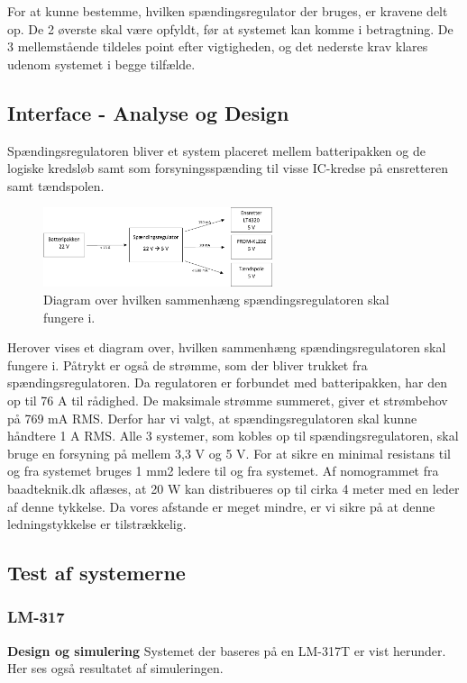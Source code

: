 For at kunne bestemme, hvilken spændingsregulator der bruges, er kravene delt op. De 2 øverste skal være opfyldt, før at systemet kan komme i betragtning. De 3 mellemstående tildeles point efter vigtigheden, og det nederste krav klares udenom systemet i begge tilfælde.

\subsection{Interface - Analyse og Design }
\label{sec:interface-analyse-og}

Spændingsregulatoren bliver et system placeret mellem batteripakken og de logiske kredsløb samt som forsyningsspænding til visse IC-kredse på ensretteren samt tændspolen.

\begin{figure}[h]
  \centering
  \includegraphics[width=0.6\textwidth]{jfig1.pdf}
  \caption{Diagram over hvilken sammenhæng spændingsregulatoren skal fungere i.}
  \label{fig:dia1}
\end{figure}

Herover vises et diagram over, hvilken sammenhæng spændingsregulatoren skal fungere i. Påtrykt er også de strømme, som der bliver trukket fra spændingsregulatoren. Da regulatoren er forbundet med batteripakken, har den op til 76 A til rådighed. De maksimale strømme summeret, giver et strømbehov på 769 mA RMS. Derfor har vi valgt, at spændingsregulatoren skal kunne håndtere 1 A RMS. Alle 3 systemer, som kobles op til spændingsregulatoren, skal bruge en forsyning på mellem 3,3 V og 5 V. 
For at sikre en minimal resistans til og fra systemet bruges 1 mm2 ledere til og fra systemet. Af nomogrammet fra baadteknik.dk aflæses, at 20 W kan distribueres op til cirka 4 meter med en leder af denne tykkelse. Da vores afstande er meget mindre, er vi sikre på at denne ledningstykkelse er tilstrækkelig. 


\subsection{Test af systemerne}
\label{sec:test-af-systemerne}

\subsubsection{LM-317}
\label{sec:lm-317}
\textbf{Design og simulering}\newline
Systemet der baseres på en LM-317T er vist herunder. Her ses også resultatet af simuleringen.

